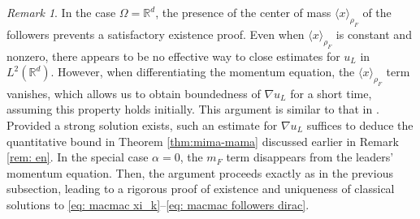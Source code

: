 \documentclass[10pt, reqno]{amsart}
\theoremstyle{definition}
\theoremstyle{remark}
\newtheorem{remark}[theorem]{Remark}
\numberwithin{equation}{section}
\newcommand{\R}{\mathbb{R}}
\begin{document}
 
 



\begin{remark}\label{rmk_ff}
In the case $\Omega = \R^d$, the presence of the center of mass $\langle x \rangle_{\rho_F}$ of the followers prevents a satisfactory existence proof. Even when $\langle x \rangle_{\rho_F}$ is constant and nonzero, there appears to be no effective way to close estimates for $u_L$ in $L^2(\mathbb{R}^d)$. However, when differentiating the momentum equation, the $\langle x \rangle_{\rho_F}$ term vanishes, which allows us to obtain boundedness of $\nabla u_L$ for a short time, assuming this property holds initially. This argument is similar to that in \cite{CC21}. Provided a strong solution exists, such an estimate for $\nabla u_L$ suffices to deduce the quantitative bound in Theorem \ref{thm:mima-mama} discussed earlier in Remark \ref{rem: en}.
In the special case $\alpha = 0$, the $m_F$ term disappears from the leaders' momentum equation. Then, the argument proceeds exactly as in the previous subsection, leading to a rigorous proof of existence and uniqueness of classical solutions to \eqref{eq: macmac xi_k}--\eqref{eq: macmac followers dirac}.
\end{remark}


%
%
%
%
%


%
%
%
%
%
\end{document}
